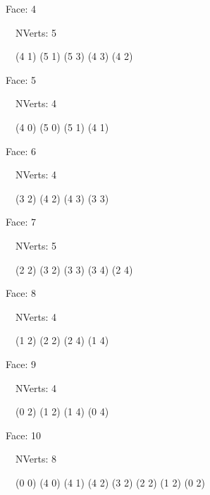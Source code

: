 \documentclass{article}
\begin{document}
    {\footnotesize

    Face: 4

    \   \    NVerts: 5

     \   \   (4 1) (5 1) (5 3) (4 3) (4 2)}

    {\footnotesize

    Face: 5

    \   \    NVerts: 4

     \   \   (4 0) (5 0) (5 1) (4 1)}

    {\footnotesize

    Face: 6

    \   \    NVerts: 4

     \   \   (3 2) (4 2) (4 3) (3 3)}

    {\footnotesize

    Face: 7

    \   \    NVerts: 5

     \   \   (2 2) (3 2) (3 3) (3 4) (2 4)}

    {\footnotesize

    Face: 8

    \   \    NVerts: 4

     \   \   (1 2) (2 2) (2 4) (1 4)}

    {\footnotesize

    Face: 9

    \   \    NVerts: 4

     \   \   (0 2) (1 2) (1 4) (0 4)}

    {\footnotesize

    Face: 10

    \   \    NVerts: 8

     \   \   (0 0) (4 0) (4 1) (4 2) (3 2) (2 2) (1 2) (0 2)}


     \newpage
\end{document}
